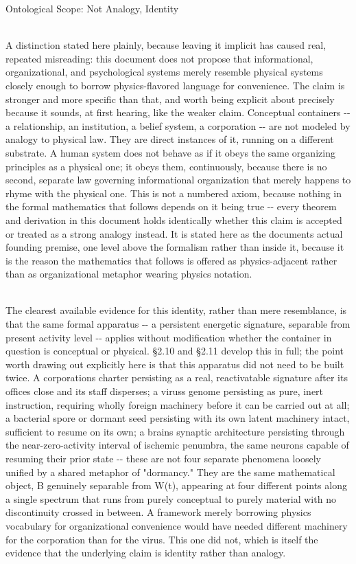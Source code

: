 \documentclass[
]{article}
\begin{document}
Ontological Scope: Not Analogy, Identity\\
\strut \\
A distinction stated here plainly, because leaving it implicit has
caused real, repeated misreading: this document does not propose that
informational, organizational, and psychological systems merely resemble
physical systems closely enough to borrow physics-flavored language for
convenience. The claim is stronger and more specific than that, and
worth being explicit about precisely because it sounds, at first
hearing, like the weaker claim. Conceptual containers -\/- a
relationship, an institution, a belief system, a corporation -\/- are
not modeled by analogy to physical law. They are direct instances of it,
running on a different substrate. A human system does not behave as if
it obeys the same organizing principles as a physical one; it obeys
them, continuously, because there is no second, separate law governing
informational organization that merely happens to rhyme with the
physical one. This is not a numbered axiom, because nothing in the
formal mathematics that follows depends on it being true -\/- every
theorem and derivation in this document holds identically whether this
claim is accepted or treated as a strong analogy instead. It is stated
here as the document\textquotesingle s actual founding premise, one
level above the formalism rather than inside it, because it is the
reason the mathematics that follows is offered as physics-adjacent
rather than as organizational metaphor wearing physics notation.\\
\strut \\
The clearest available evidence for this identity, rather than mere
resemblance, is that the same formal apparatus -\/- a persistent
energetic signature, separable from present activity level -\/- applies
without modification whether the container in question is conceptual or
physical. §2.10 and §2.11 develop this in full; the point worth drawing
out explicitly here is that this apparatus did not need to be built
twice. A corporation\textquotesingle s charter persisting as a real,
reactivatable signature after its offices close and its staff disperses;
a virus\textquotesingle s genome persisting as pure, inert instruction,
requiring wholly foreign machinery before it can be carried out at all;
a bacterial spore or dormant seed persisting with its own latent
machinery intact, sufficient to resume on its own; a
brain\textquotesingle s synaptic architecture persisting through the
near-zero-activity interval of ischemic penumbra, the same neurons
capable of resuming their prior state -\/- these are not four separate
phenomena loosely unified by a shared metaphor of "dormancy." They are
the same mathematical object, B genuinely separable from W(t), appearing
at four different points along a single spectrum that runs from purely
conceptual to purely material with no discontinuity crossed in between.
A framework merely borrowing physics vocabulary for organizational
convenience would have needed different machinery for the corporation
than for the virus. This one did not, which is itself the evidence that
the underlying claim is identity rather than analogy.
\end{document}
